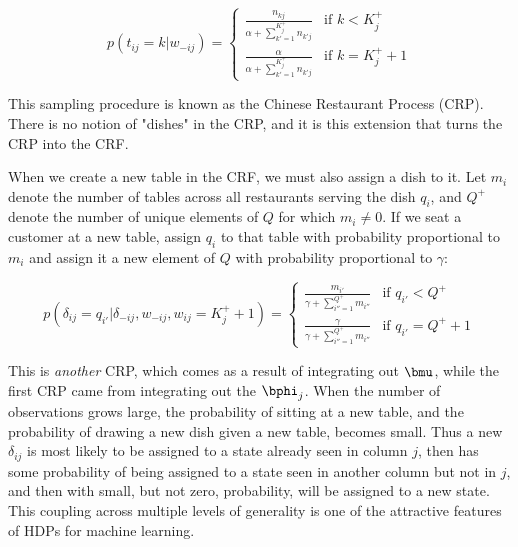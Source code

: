 {\begin{equation}
 p(t_{ij} = k | w_{-ij}) = 
 \begin{cases} 
 \frac{n_{kj}}{\alpha + \sum_{k'=1}^{K^+_j}n_{k'j}} & \text{if } k < K^+_j \\
 \frac{\alpha}{\alpha + \sum_{k'=1}^{K^+_j}n_{k'j}} & \text{if } k = K^+_j + 1\label{crf:low}
 \end{cases}
\end{equation}

This sampling procedure is known as the Chinese Restaurant Process (CRP).  There is no notion of "dishes" in the CRP, and it is this extension that turns the CRP into the CRF.

When we create a new table in the CRF, we must also assign a dish to it.    Let $m_i$ denote the number of tables across all restaurants serving the dish $q_i$, and $Q^+$ denote the number of unique elements of $Q$ for which $m_i \ne 0$.  If we seat a customer at a new table, assign $q_i$ to that table with probability proportional to $m_i$ and assign it a new element of $Q$ with probability proportional to $\gamma$:

\begin{equation}
p(\delta_{ij} = q_{i'} | \delta_{-ij}, w_{-ij}, w_{ij} = K^+_j + 1) = 
\begin{cases}
\frac{m_{i'}}{\gamma + \sum_{i'' = 1}^{Q^+} m_{i''} } & \text{if } q_{i'} < Q^+ \\
\frac{\gamma}{\gamma + \sum_{i'' = 1}^{Q^+} m_{i''} } & \text{if } q_{i'} = Q^+ + 1\label{crf:high}
\end{cases}
\end{equation}

This is {\em another} CRP, which comes as a result of integrating out $\bmu$, while the first CRP came from integrating out the $\bphi_j$.  When the number of observations grows large, the probability of sitting at a new table, and the probability of drawing a new dish given a new table, becomes small.  Thus a new $\delta_{ij}$ is most likely to be assigned to a state already seen in column $j$, then has some probability of being assigned to a state seen in another column but not in $j$, and then with small, but not zero, probability, will be assigned to a new state.  This coupling across multiple levels of generality is one of the attractive features of HDPs for machine learning.


}
